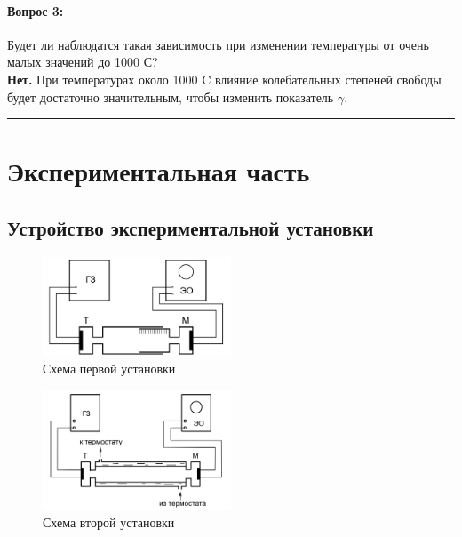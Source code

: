 \documentclass[a4paper,12pt]{article} %
\begin{document}
\paragraph{Вопрос 3:}
Будет ли наблюдатся такая зависимость при изменении температуры от очень малых значений до 1000 \degree С?\\

\textbf{Нет.} При температурах около 1000 \degree C влияние колебательных степеней свободы будет достаточно значительным, чтобы изменить показатель $\gamma$.

\medskip\hrule\medskip

\section{Экспериментальная часть}

\subsection{Устройство экспериментальной установки}


\begin{figure}[h] %
\begin{center}
\includegraphics[width=0.5\textwidth]{setup1.png}
\end{center}
\caption{Схема первой установки}
\label{fig:setup1}
\end{figure}

\begin{figure}[h] %
\begin{center}
\includegraphics[width=0.5\textwidth]{setup2.png}
\end{center}
\caption{Схема второй установки}
\label{fig:setup2}
\end{figure}
\end{document}
